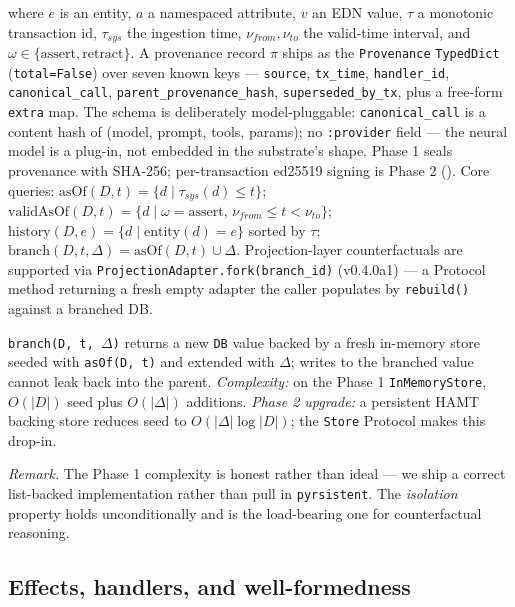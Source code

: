 \documentclass[anon]{nesy2026}   %
\newcommand{\C}[1]{\texttt{#1}}
\begin{document}
where $e$ is an entity, $a$ a namespaced attribute, $v$ an EDN value, $\tau$ a monotonic transaction id, $\tau_{sys}$ the ingestion time, $\nu_{from},\nu_{to}$ the valid-time interval, and $\omega \in \{\text{assert}, \text{retract}\}$. A provenance record $\pi$ ships as the \C{Provenance} \C{TypedDict} (\C{total=False}) over seven known keys --- \C{source}, \C{tx\_time}, \C{handler\_id}, \C{canonical\_call}, \C{parent\_provenance\_hash}, \C{superseded\_by\_tx}, plus a free-form \C{extra} map. The schema is deliberately model-pluggable: \C{canonical\_call} is a content hash of (model, prompt, tools, params); no \C{:provider} field --- the neural model is a plug-in, not embedded in the substrate's shape. Phase 1 seals provenance with SHA-256; per-transaction ed25519 signing is Phase 2 (). Core queries: $\text{asOf}(D, t) = \{d \mid \tau_{sys}(d) \leq t\}$; $\text{validAsOf}(D, t) = \{d \mid \omega = \text{assert},\, \nu_{from} \leq t < \nu_{to}\}$; $\text{history}(D, e) = \{d \mid \text{entity}(d) = e\}$ sorted by $\tau$; $\text{branch}(D, t, \Delta) = \text{asOf}(D, t) \cup \Delta$. Projection-layer counterfactuals are supported via \C{ProjectionAdapter.fork(branch\_id)} (v0.4.0a1) --- a Protocol method returning a fresh empty adapter the caller populates by \C{rebuild()} against a branched DB.

\begin{proposition}\label{prop:branch}
\C{branch(D, t, $\Delta$)} returns a new \C{DB} value backed by a fresh in-memory store seeded with \C{asOf(D, t)} and extended with $\Delta$; writes to the branched value cannot leak back into the parent. \emph{Complexity:} on the Phase 1 \C{InMemoryStore}, $O(|D|)$ seed plus $O(|\Delta|)$ additions. \emph{Phase 2 upgrade:} a persistent HAMT backing store reduces seed to $O(|\Delta| \log |D|)$; the \C{Store} Protocol makes this drop-in.
\end{proposition}

\emph{Remark.} The Phase 1 complexity is honest rather than ideal --- we ship a correct list-backed implementation rather than pull in \C{pyrsistent}. The \emph{isolation} property holds unconditionally and is the load-bearing one for counterfactual reasoning.

\subsection{Effects, handlers, and well-formedness}\label{sec:effects}
\end{document}
